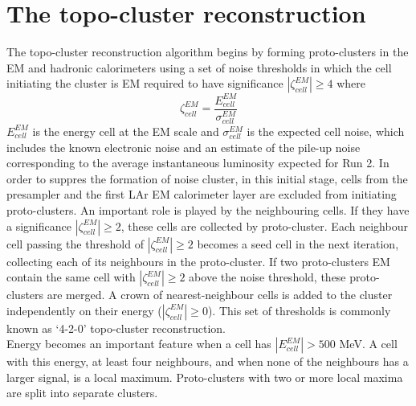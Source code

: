 \documentclass[a4paper, oneside]{book}
\begin{document}
		\section{The topo-cluster reconstruction}
			The topo-cluster reconstruction algorithm begins by forming proto-clusters in the EM and hadronic calorimeters using a set of noise thresholds in which the cell initiating the cluster is EM required to have significance $|\zeta_{cell}^{EM}| \geq 4$ where 
			$$
			\zeta_{cell}^{EM} = \frac{E_{cell}^{EM}}{\sigma_{cell}^{EM}}
			$$		
			$E_{cell}^{EM}$ is the energy cell at the EM scale and $\sigma_{cell}^{EM}$ is the expected cell noise, which includes the known electronic noise and an estimate of the pile-up noise corresponding
			to the average instantaneous luminosity expected for Run 2. In order to suppres the formation of noise cluster, in this initial stage, cells from the presampler and the first LAr EM calorimeter layer are excluded from initiating proto-clusters.
			An important role is played by the neighbouring cells. If they have a significance $|\zeta_{cell}^{EM}| \geq 2$, these cells are collected by proto-cluster. Each neighbour cell passing the threshold of $|\zeta_{cell}^{EM}| \geq 2$ becomes a seed cell in the next iteration, collecting each of its neighbours in the proto-cluster. If two proto-clusters EM contain the same cell with $|\zeta_{cell}^{EM}| \geq 2$ above the noise threshold, these proto-clusters are merged. A crown of nearest-neighbour cells is added to the cluster independently on their energy ($|\zeta_{cell}^{EM}| \geq 0$). This set of thresholds is commonly known as ‘4-2-0’ topo-cluster reconstruction.\\
			Energy becomes an important feature when a cell has $|E_{cell}^{EM}| > 500$ MeV. A cell with this energy, at least four neighbours, and when none of the neighbours has a larger signal, is a local maximum. Proto-clusters with two or more local maxima are split into separate clusters.
			
		
\end{document}
